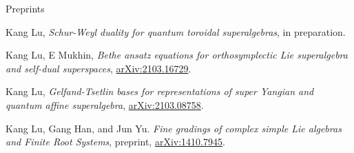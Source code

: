 \documentclass{resume} %
\begin{document}


\begin{rSection}{Preprints}
\begin{etaremune}[leftmargin=0cm]

\item Kang Lu, {\it Schur-Weyl duality for quantum toroidal superalgebras}, in preparation.

\item Kang Lu, E Mukhin, {\it Bethe ansatz equations for orthosymplectic Lie superalgebra and self-dual superspaces}, \href{https://arxiv.org/abs/2103.16729}{arXiv:2103.16729}.

\item Kang Lu, {\it Gelfand-Tsetlin bases for representations of super Yangian and quantum affine superalgebra}, \href{https://arxiv.org/abs/2103.08758}{arXiv:2103.08758}.

\item Kang Lu, Gang Han, and Jun Yu.
{\it Fine gradings of complex simple Lie algebras and Finite Root Systems}, preprint, \href{https://arxiv.org/abs/1410.7945}{arXiv:1410.7945}. 
		
\end{etaremune}
\end{rSection}
\end{document}
